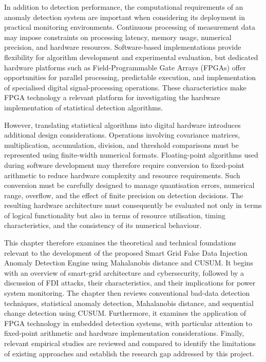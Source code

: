 \documentclass[12pt,a4paper]{report}
\begin{document}
In addition to detection performance, the computational requirements of an anomaly detection
system are important when considering its deployment in practical monitoring environments.
Continuous processing of measurement data may impose constraints on processing latency,
memory usage, numerical precision, and hardware resources. Software-based implementations
provide flexibility for algorithm development and experimental evaluation, but dedicated
hardware platforms such as Field-Programmable Gate Arrays (FPGAs) offer opportunities for
parallel processing, predictable execution, and implementation of specialised digital
signal-processing operations. These characteristics make FPGA technology a relevant platform
for investigating the hardware implementation of statistical detection algorithms.

However, translating statistical algorithms into digital hardware introduces additional
design considerations. Operations involving covariance matrices, multiplication, accumulation,
division, and threshold comparisons must be represented using finite-width numerical formats.
Floating-point algorithms used during software development may therefore require conversion
to fixed-point arithmetic to reduce hardware complexity and resource requirements. Such
conversion must be carefully designed to manage quantisation errors, numerical range,
overflow, and the effect of finite precision on detection decisions. The resulting hardware
architecture must consequently be evaluated not only in terms of logical functionality but
also in terms of resource utilisation, timing characteristics, and the consistency of its
numerical behaviour.

This chapter therefore examines the theoretical and technical foundations relevant to the
development of the proposed Smart Grid False Data Injection Anomaly Detection Engine using
Mahalanobis distance and CUSUM. It begins with an overview of smart-grid architecture and
cybersecurity, followed by a discussion of FDI attacks, their characteristics, and their
implications for power system monitoring. The chapter then reviews conventional bad-data
detection techniques, statistical anomaly detection, Mahalanobis distance, and sequential
change detection using CUSUM. Furthermore, it examines the application of FPGA technology
in embedded detection systems, with particular attention to fixed-point arithmetic and
hardware implementation considerations. Finally, relevant empirical studies are reviewed
and compared to identify the limitations of existing approaches and establish the research
gap addressed by this project.
\end{document}

